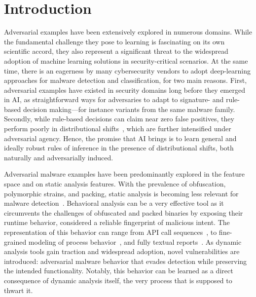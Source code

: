 \section{Introduction}
Adversarial examples have been extensively explored in numerous domains. While the fundamental challenge they pose to learning is fascinating on its own scientific accord, they also represent a significant threat to the widespread adoption of machine learning solutions in security-critical scenarios.
At the same time, there is an eagerness by many cybersecurity vendors to adopt deep-learning approaches for malware detection and classification, for two main reasons.
First, adversarial examples have existed in security domains long before they emerged in \gls{AI}, as straightforward ways for adversaries to adapt to signature- and rule-based decision making---for instance variants from the same malware family.
Secondly, while rule-based decisions can claim near zero false positives, they perform poorly in distributional shifts~\cite{upadhyay2021towards}, which are further intensified under adversarial agency.
Hence, the promise that \gls{AI} brings is to learn general and ideally robust rules of inference in the presence of distributional shifts, both naturally and adversarially induced.

Adversarial malware examples have been predominantly explored in the feature space and on static analysis features.
With the prevalence of obfuscation, polymorphic strains, and packing, static analysis is becoming less relevant for malware detection~\cite{aghakhani2020malware}.
Behavioral analysis can be a very effective tool as it circumvents the challenges of obfuscated and packed binaries by exposing their runtime behavior, considered a reliable fingerprint of malicious intent.
The representation of this behavior can range from API call sequences~\cite{tian2010differentiating, rosenberg2018generic}, to fine-grained modeling of process behavior~\cite{continella2016shieldfs}, and fully textual reports~\cite{mandlik2022jsongrinder}.
As dynamic analysis tools gain traction and widespread adoption, novel vulnerabilities are introduced: adversarial malware behavior that evades detection while preserving the intended functionality.
Notably, this behavior can be learned as a direct consequence of dynamic analysis itself, the very process that is supposed to thwart it.

